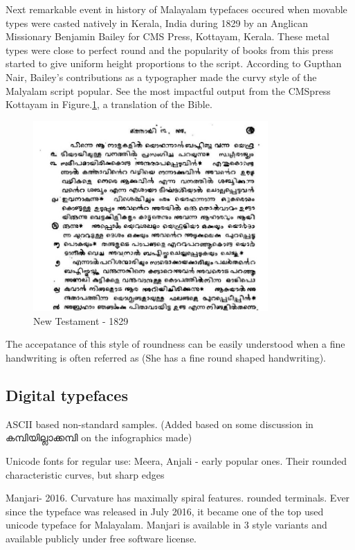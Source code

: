 \documentclass[10pt]{article}
\begin{document}
Next remarkable event in history of Malayalam typefaces occured when movable types were casted natively in Kerala, India during 1829 by an Anglican Missionary Benjamin Bailey\cite{babucherian} for CMS Press, Kottayam, Kerala. These metal types were close to perfect round and the popularity of books from this press started to give uniform height proportions to the script. According to Gupthan Nair, Bailey's contributions as a typographer made the curvy style of the Malyalam script popular\cite{gupthannair}. See the most impactful output from the CMSpress Kottayam in Figure.\ref{newtestament}, a translation of the Bible.


\begin{figure}
	\centering
	\includegraphics[width=0.8\textwidth]{images/newtestament1829.png}
	\caption{New Testament - 1829}
	\label{newtestament}
\end{figure}

The accepatance of this style of roundness can be easily understood when a fine handwriting is often referred as { } (She has a fine round shaped handwriting).


\subsection{Digital typefaces}

ASCII based non-standard samples. (Added based on some discussion in {\manjari കമ്പിയില്ലാക്കമ്പി} on the infographics made) 

Unicode fonts for regular use: Meera, Anjali - early popular ones.  Their rounded characteristic curves, but sharp edges

Manjari- 2016. Curvature has maximally spiral features. rounded terminals.  Ever since the typeface was released in July 2016, it became one of the top used unicode typeface for Malayalam. Manjari is available in 3 style variants and available publicly under free software license. 
\end{document}
